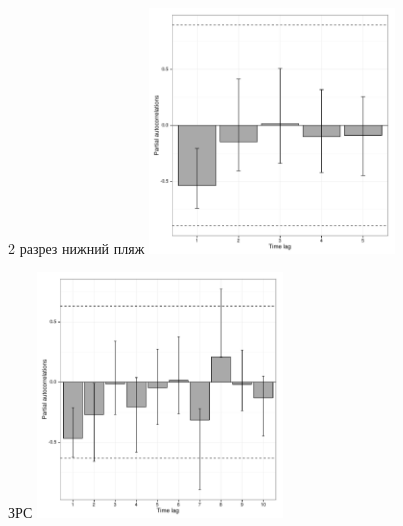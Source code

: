 \documentclass[12pt, a4paper]{disser}
\begin{document}
\begin{figure}[ht]
	\begin{minipage}[b]{.46\linewidth}
	\begin{center}
	{\tiny 2 разрез нижний пляж}
	\includegraphics[width=65mm]{../White_Sea/dynamic_N_N1/boot_PRCF_razrez2_low_beatch_.pdf}
	\end{center}
	\end{minipage}
%
	\hfil %
%
	\begin{minipage}[b]{.46\linewidth}
	\begin{center}	
	{\tiny ЗРС}
	\includegraphics[width=65mm]{../White_Sea/dynamic_N_N1/boot_PRCF_ZRS_.pdf}
	\end{center}
	\end{minipage}



\end{figure}
\end{document}

